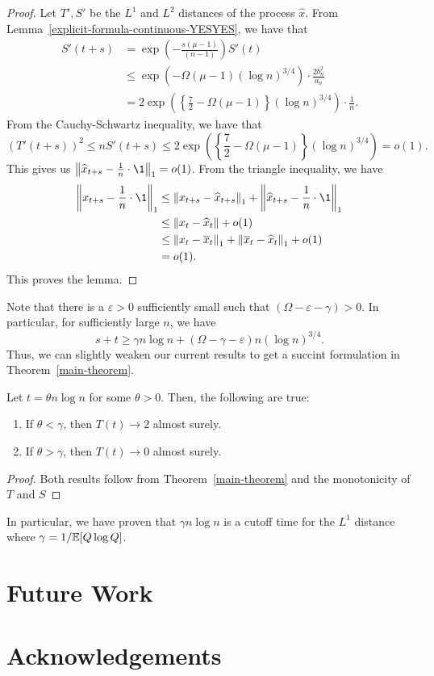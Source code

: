 \documentclass[12pt]{article}
\begin{document}
\begin{proof}
	Let $T', S'$ be the $L^1$ and $L^2$ distances of the process $\widehat{x}$. From Lemma~\ref{explicit-formula-continuous-YESYES}, we have that
	\begin{align*}
		S'(t+s) & = \exp \left ( - \frac{s (\mu-1)}{(n-1)} \right ) S'(t) \\
		& \leq \exp(- \Omega (\mu-1) (\log n)^{3/4}) \cdot \frac{2b_n^2}{a_n} \\
		& = 2 \exp \left ( \left \{ \frac{7}{2} - \Omega (\mu - 1) \right \} (\log n)^{3/4} \right ) \cdot \frac{1}{n}.
	\end{align*}
	From the Cauchy-Schwartz inequality, we have that
	\[
		(T'(t+s))^2 \leq n S'(t+s) \leq 2 \exp \left ( \left \{ \frac{7}{2} - \Omega (\mu - 1) \right \} (\log n)^{3/4} \right ) = o(1).
	\]
	This gives us $\norm{\widehat{x}_{t+s} - \frac{1}{n} \cdot \1}_1 = o(1)$. From the triangle inequality, we have
	\begin{align*}
		\norm{x_{t+s} - \frac{1}{n} \cdot \1}_1 & \leq \norm{x_{t+s} - \widehat{x}_{t+s}}_1 + \norm{\widehat{x}_{t+s} - \frac{1}{n} \cdot \1}_1 \\
		& \leq \norm{x_t - \widehat{x}_t} + o(1) \\
		& \leq \norm{x_t - \overline{x}_t}_1 + \norm{\overline{x}_t - \widehat{x}_t}_1 + o(1) \\
		& = o(1).
	\end{align*}
	This proves the lemma. 
\end{proof}

Note that there is a $\varepsilon > 0$ sufficiently small such that $(\Omega - \varepsilon - \gamma) > 0$. In particular, for sufficiently large $n$, we have 
\[
	s + t \geq \gamma n \log n + (\Omega - \gamma - \varepsilon) n (\log n)^{3/4}.
\]
Thus, we can slightly weaken our current results to get a succint formulation in Theorem~\ref{main-theorem}. 

\begin{thm} \label{main-theorem}
	Let $t = \theta n \log n$ for some $\theta > 0$. Then, the following are true:
	\begin{enumerate}[label = (\alph*)]
		\item If $\theta < \gamma$, then $T(t) \to 2$ almost surely. 
		\item If $\theta > \gamma$, then $T(t) \to 0$ almost surely. 
	\end{enumerate}
\end{thm}

\begin{proof}
	Both results follow from Theorem~\ref{main-theorem} and the monotonicity of $T$ and $S$
\end{proof}

In particular, we have proven that $\gamma n \log n$ is a cutoff time for the $L^1$ distance where $\gamma = 1/\mathbb{E}[Q \log Q]$.

\section{Future Work} 

\section*{Acknowledgements}



\end{document}
